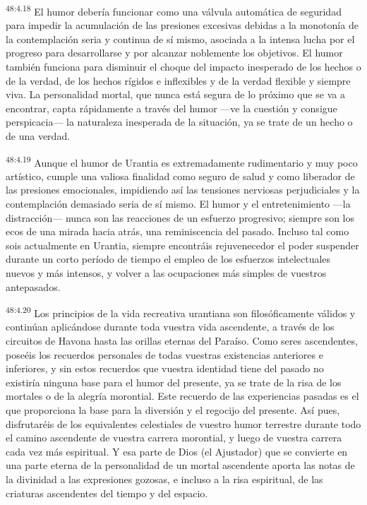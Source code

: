 \par
\textsuperscript{48:4.18} El humor debería funcionar como una válvula automática de seguridad para impedir la acumulación de las presiones excesivas debidas a la monotonía de la contemplación seria y continua de sí mismo, asociada a la intensa lucha por el progreso para desarrollarse y por alcanzar noblemente los objetivos. El humor también funciona para disminuir el choque del impacto inesperado de los hechos o de la verdad, de los hechos rígidos e inflexibles y de la verdad flexible y siempre viva. La personalidad mortal, que nunca está segura de lo próximo que se va a encontrar, capta rápidamente a través del humor ---ve la cuestión y consigue perspicacia--- la naturaleza inesperada de la situación, ya se trate de un hecho o de una verdad.

\par
\textsuperscript{48:4.19} Aunque el humor de Urantia es extremadamente rudimentario y muy poco artístico, cumple una valiosa finalidad como seguro de salud y como liberador de las presiones emocionales, impidiendo así las tensiones nerviosas perjudiciales y la contemplación demasiado seria de sí mismo. El humor y el entretenimiento ---la distracción--- nunca son las reacciones de un esfuerzo progresivo; siempre son los ecos de una mirada hacia atrás, una reminiscencia del pasado. Incluso tal como sois actualmente en Urantia, siempre encontráis rejuvenecedor el poder suspender durante un corto período de tiempo el empleo de los esfuerzos intelectuales nuevos y más intensos, y volver a las ocupaciones más simples de vuestros antepasados.

\par
\textsuperscript{48:4.20} Los principios de la vida recreativa urantiana son filosóficamente válidos y continúan aplicándose durante toda vuestra vida ascendente, a través de los circuitos de Havona hasta las orillas eternas del Paraíso. Como seres ascendentes, poseéis los recuerdos personales de todas vuestras existencias anteriores e inferiores, y sin estos recuerdos que vuestra identidad tiene del pasado no existiría ninguna base para el humor del presente, ya se trate de la risa de los mortales o de la alegría morontial. Este recuerdo de las experiencias pasadas es el que proporciona la base para la diversión y el regocijo del presente. Así pues, disfrutaréis de los equivalentes celestiales de vuestro humor terrestre durante todo el camino ascendente de vuestra carrera morontial, y luego de vuestra carrera cada vez más espiritual. Y esa parte de Dios (el Ajustador) que se convierte en una parte eterna de la personalidad de un mortal ascendente aporta las notas de la divinidad a las expresiones gozosas, e incluso a la risa espiritual, de las criaturas ascendentes del tiempo y del espacio.

